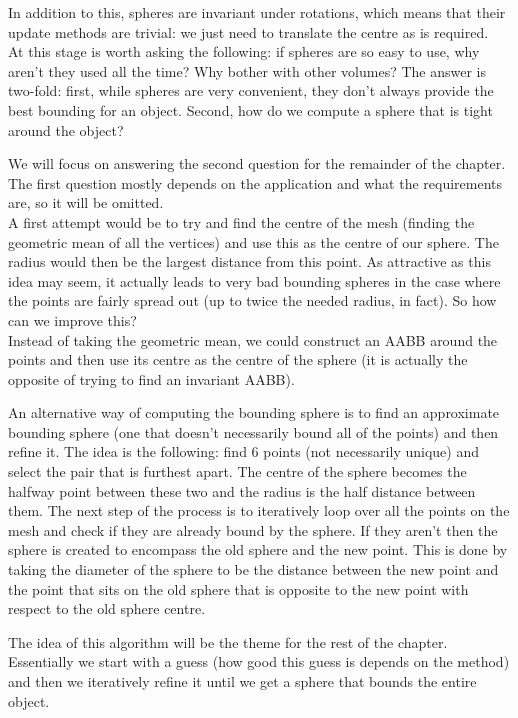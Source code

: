     In addition to this, spheres are invariant under rotations, which means that
    their update methods are trivial: we just need to translate the centre as is
    required.\\
    At this stage is worth asking the following: if spheres are so easy to use,
    why aren't they used all the time? Why bother with other volumes? The answer
    is two-fold: first, while spheres are very convenient, they don't always
    provide the best bounding for an object. Second, how do we compute a sphere
    that is tight around the object?

    We will focus on answering the second question for the remainder of the
    chapter. The first question mostly depends on the application and what the
    requirements are, so it will be omitted.\\
    A first attempt would be to try and find the centre of the mesh (finding
    the geometric mean of all the vertices) and use this as the centre of
    our sphere. The radius would then be the largest distance from this
    point. As attractive as this idea may seem, it actually leads to very
    bad bounding spheres in the case where the points are fairly spread out (up
    to twice the needed radius, in fact). So how can we improve this?\\
    Instead of taking the geometric mean, we could construct an AABB around the
    points and then use its centre as the centre of the sphere (it is actually
    the opposite of trying to find an invariant AABB).

    An alternative way of computing the bounding sphere is to find an
    approximate bounding sphere (one that doesn't necessarily bound all of
    the points) and then refine it. The idea is the following: find 6 points
    (not necessarily unique) and select the pair that is furthest apart. The
    centre of the sphere becomes the halfway point between these two and the
    radius is the half distance between them. The next step of the process
    is to iteratively loop over all the points on the mesh and check if they
    are already bound by the sphere. If they aren't then the sphere is
    created to encompass the old sphere and the new point. This is done by
    taking the diameter of the sphere to be the distance between the new
    point and the point that sits on the old sphere that is opposite to the
    new point with respect to the old sphere centre.

    The idea of this algorithm will be the theme for the rest of the chapter.
    Essentially we start with a guess (how good this guess is depends on the
    method) and then we iteratively refine it until we get a sphere that bounds
    the entire object.

